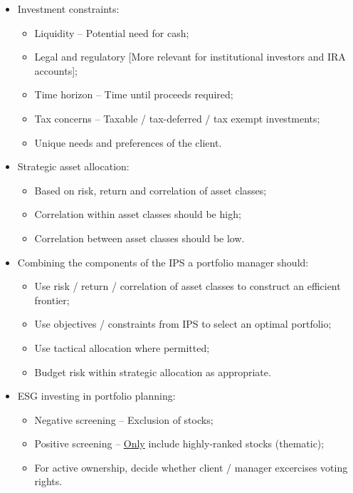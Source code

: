 \documentclass[../notes_compiled.tex]{subfiles}
\begin{document}
\begin{itemize}
\item Investment constraints:
\begin{itemize}
\item Liquidity -- Potential need for cash;
\item Legal and regulatory [More relevant for institutional investors and IRA accounts];
\item Time horizon -- Time until proceeds required;
\item Tax concerns -- Taxable / tax-deferred / tax exempt investments;
\item Unique needs and preferences of the client.
\end{itemize}
\item Strategic asset allocation:
\begin{itemize}
\item Based on risk, return and correlation of asset classes;
\item Correlation within asset classes should be high;
\item Correlation between asset classes should be low.
\end{itemize}
\item Combining the components of the IPS a portfolio manager should:
\begin{itemize}
\item Use risk / return / correlation of asset classes to construct an efficient frontier;
\item Use objectives / constraints from IPS to select an optimal portfolio;
\item Use tactical allocation where permitted;
\item Budget risk within strategic allocation as appropriate.
\end{itemize}
\item ESG investing in portfolio planning:
\begin{itemize}
\item Negative screening -- Exclusion of stocks;
\item Positive screening -- \underline{Only} include highly-ranked stocks (thematic);
\item For active ownership, decide whether client / manager excercises voting rights.
\end{itemize}
\end{itemize}
\end{document}
